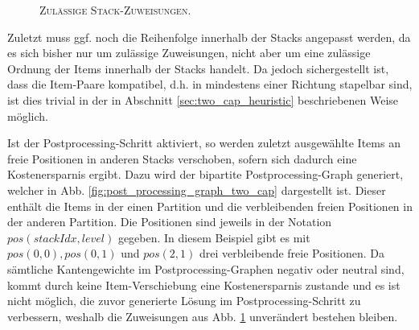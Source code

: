 \begin{figure}[H]
  \centering
    \caption{\textsc{Zulässige Stack-Zuweisungen.}}
    \label{fig:stacking_solution}
\end{figure}

Zuletzt muss ggf. noch die Reihenfolge innerhalb der Stacks angepasst werden, da es sich bisher nur um zulässige Zuweisungen,
nicht aber um eine zulässige Ordnung der Items innerhalb der Stacks handelt.
Da jedoch sichergestellt ist, dass die Item-Paare kompatibel, d.h. in mindestens einer Richtung stapelbar sind,
ist dies trivial in der in Abschnitt \ref{sec:two_cap_heuristic} beschriebenen Weise möglich.

\pagebreak

Ist der Postprocessing-Schritt aktiviert, so werden zuletzt ausgewählte Items an freie Positionen in anderen Stacks
verschoben, sofern sich dadurch eine Kostenersparnis ergibt. Dazu wird der bipartite Postprocessing-Graph generiert, welcher in
Abb. \ref{fig:post_processing_graph_two_cap} dargestellt ist. Dieser enthält die Items in der einen Partition
und die verbleibenden freien Positionen in der anderen Partition. Die Positionen sind jeweils in der Notation
$pos(stackIdx, level)$ gegeben.
In diesem Beispiel gibt es mit $pos(0, 0), pos(0, 1)$ und $pos(2, 1)$ drei verbleibende freie Positionen.
Da sämtliche Kantengewichte im Postprocessing-Graphen negativ oder neutral sind, kommt durch keine Item-Verschiebung
eine Kostenersparnis zustande und es ist nicht möglich, die zuvor generierte Lösung im Postprocessing-Schritt zu
verbessern, weshalb die Zuweisungen aus Abb. \ref{fig:stacking_solution} unverändert bestehen bleiben.


